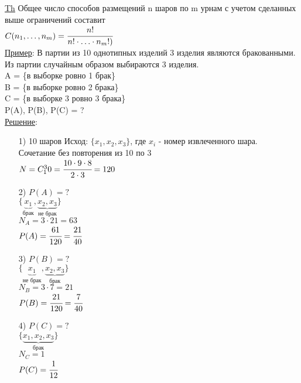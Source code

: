 \underline{Th} Общее число способов размещений n шаров по m урнам с учетом сделанных выше ограничений составит \\
$C(n_1, \ldots, n_m) = \cfrac{n!}{n! \cdot \ldots \cdot n_m!)}$ \\

\underline{Пример}: В партии из 10 однотипных изделий 3 изделия являются бракованными. Из партии случайным образом выбираются 3 изделия. \\
A = \{в выборке ровно 1 брак\} \\
B = \{в выборке ровно 2 брака\} \\
C = \{в выборке 3 ровно 3 брака\} \\
P(A), P(B), P(C) = ? \\
\underline{Решение}:
\begin{enumerate}
\item[1)] 10 шаров
Исход: $\{x_1, x_2, x_3\}$, где $x_i$ - номер извлеченного шара. \\
Сочетание без повторения из 10 по 3 \\
$N = C^3_10 = \cfrac{10 \cdot 9 \cdot 8}{2 \cdot 3} = 120$ \\

\item[2)] $P(A) = ?$ \\
$\{ \underbrace{x_1}_{\text{брак}}, \underbrace{x_2, x_3}_{\text{не брак}} \}$ \\
$N_A = 3 \cdot 21 = 63$ \\
$P(A) = \cfrac{61}{120} = \cfrac{21}{40}$ \\

\item[3)] $P(B) = ?$ \\
$\{ \underbrace{x_1}_{\text{не брак}}, \underbrace{x_2, x_3}_{\text{брак}} \}$ \\
$N_B = 3 \cdot 7 = 21$ \\
$P(B) = \cfrac{21}{120} = \cfrac{7}{40}$ \\

\item[4)] $P(C) = ?$ \\
$\{ \underbrace{x_1, x_2, x_3}_{\text{брак}} \}$ \\
$N_C = 1$ \\
$P(C) = \cfrac{1}{12}$ \\
\end{enumerate}


